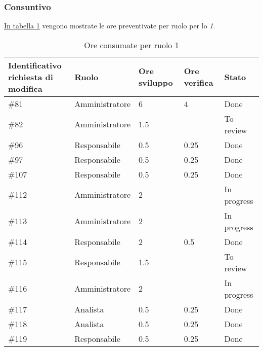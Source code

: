 \subsubsection{Consuntivo}

\hyperref[tab:sprint1_ore_consumate]{In tabella \ref{tab:sprint1_ore_consumate}} vengono mostrate le ore preventivate per ruolo per lo \textit{ 1}.

\begin{table}[H]
    \centering
        \begin{tabular}{| l | l | l | l | l |}
            \hline
            \makecell{\textbf{Identificativo} \\ \textbf{richiesta di modifica}} &
                \textbf{Ruolo} & 
                \textbf{Ore sviluppo} &
                \textbf{Ore verifica} & 
                \textbf{Stato}\\ 
    \hline
        \#81 & Amministratore & 6 & 4 & Done\\
    \hline
        \#82 & Amministratore& 1.5 &  & To review\\
    \hline
        \#96 & Responsabile & 0.5 & 0.25 & Done\\
    \hline
        \#97 & Responsabile & 0.5 & 0.25 & Done\\
    \hline
        \#107 & Responsabile & 0.5 & 0.25 & Done\\
    \hline
        \#112 & Amministratore & 2 & & In progress\\
    \hline
        \#113 & Amministratore & 2 & & In progress\\
    \hline
        \#114 & Responsabile & 2 & 0.5 & Done\\
    \hline
        \#115 & Responsabile & 1.5 & & To review\\
    \hline
        \#116 & Amministratore & 2 & & In progress\\
    \hline
        \#117 & Analista & 0.5 & 0.25 & Done\\
    \hline
        \#118 & Analista & 0.5 & 0.25 & Done\\
    \hline
        \#119 & Responsabile & 0.5 & 0.25 & Done\\
    \hline
    \end{tabular}
    \caption{Ore consumate per ruolo  1}
    \label{tab:sprint1_ore_consumate} 
\end{table}
